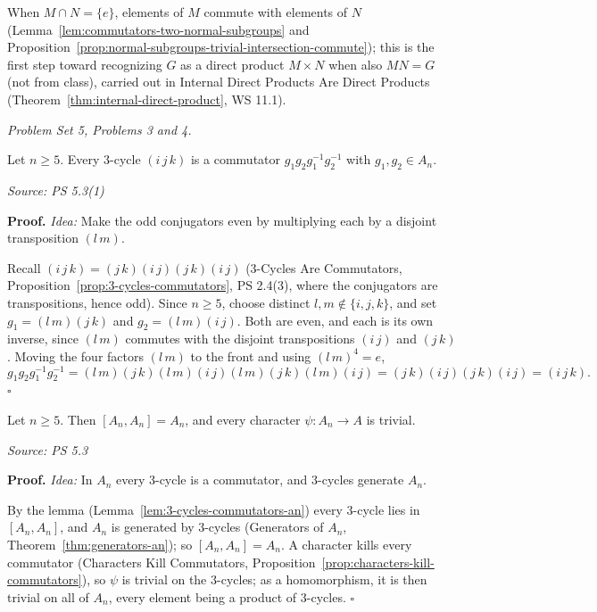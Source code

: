 \documentclass[11pt]{report}
\renewenvironment{proof}[1][Proof]{\noindent\textbf{#1.} }{\hfill$\square$\par\vspace{5pt}}
\newcommand{\srcline}[1]{\par\hfill{\footnotesize\textit{Source: #1}}}
\begin{document}
\begin{rembox}\label{rem:commutators-normal-subgroups}
When $M \cap N = \{e\}$, elements of $M$ commute with elements of $N$ (Lemma~\ref{lem:commutators-two-normal-subgroups} and Proposition~\ref{prop:normal-subgroups-trivial-intersection-commute}); this is the first step toward recognizing $G$ as a direct product $M \times N$ when also $MN = G$ (not from class), carried out in Internal Direct Products Are Direct Products (Theorem~\ref{thm:internal-direct-product}, WS 11.1).
\end{rembox}
\textit{Problem Set 5, Problems 3 and 4.}

\begin{lembox}\label{lem:3-cycles-commutators-an}
Let $n \geq 5$. Every $3$-cycle $(i\,j\,k)$ is a commutator $g_1g_2g_1^{-1}g_2^{-1}$ with $g_1, g_2 \in A_n$.
\srcline{PS 5.3(1)}
\end{lembox}

\begin{proof}
\textit{Idea:} Make the odd conjugators even by multiplying each by a disjoint transposition $(l\,m)$.\par
Recall $(i\,j\,k) = (j\,k)(i\,j)(j\,k)(i\,j)$ ($3$-Cycles Are Commutators, Proposition~\ref{prop:3-cycles-commutators}, PS 2.4(3), where the conjugators are transpositions, hence odd). Since $n \geq 5$, choose distinct $l, m \notin \{i, j, k\}$, and set $g_1 = (l\,m)(j\,k)$ and $g_2 = (l\,m)(i\,j)$. Both are even, and each is its own inverse, since $(l\,m)$ commutes with the disjoint transpositions $(i\,j)$ and $(j\,k)$. Moving the four factors $(l\,m)$ to the front and using $(l\,m)^4 = e$,
\[ g_1g_2g_1^{-1}g_2^{-1} = (l\,m)(j\,k)(l\,m)(i\,j)(l\,m)(j\,k)(l\,m)(i\,j) = (j\,k)(i\,j)(j\,k)(i\,j) = (i\,j\,k). \]
\end{proof}

\begin{thmbox}\label{thm:characters-an-trivial}
Let $n \geq 5$. Then $[A_n, A_n] = A_n$, and every character $\psi: A_n \to A$ is trivial.
\srcline{PS 5.3}
\end{thmbox}

\begin{proof}
\textit{Idea:} In $A_n$ every $3$-cycle is a commutator, and $3$-cycles generate $A_n$.\par
By the lemma (Lemma~\ref{lem:3-cycles-commutators-an}) every $3$-cycle lies in $[A_n, A_n]$, and $A_n$ is generated by $3$-cycles (Generators of $A_n$, Theorem~\ref{thm:generators-an}); so $[A_n, A_n] = A_n$. A character kills every commutator (Characters Kill Commutators, Proposition~\ref{prop:characters-kill-commutators}), so $\psi$ is trivial on the $3$-cycles; as a homomorphism, it is then trivial on all of $A_n$, every element being a product of $3$-cycles.
\end{proof}
\end{document}
